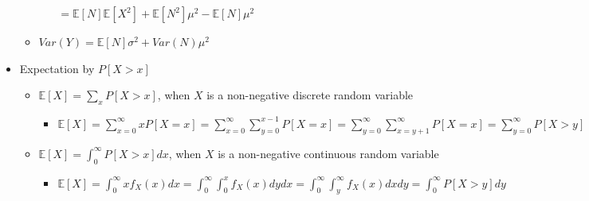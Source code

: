 \documentclass[a4paper]{article}
\begin{document}
\begin{itemize}
\begin{itemize}
\begin{itemize}
                        $= \mathbb{E}[N] \mathbb{E}[X^2] + \mathbb{E}[N^2] \mu^2 - \mathbb{E}[N] \mu^2$
                \end{itemize}
            \item $\mathit{Var}(Y) = \mathbb{E}[N]\sigma^2 + \mathit{Var}(N)\mu^2$
        \end{itemize}
    \item Expectation by $P[X>x]$
        \begin{itemize}
            \item $\mathbb{E}[X] = \sum_x P[X > x]$, when $X$ is a non-negative discrete random variable
                \begin{itemize}
                    \item $\mathbb{E}[X] = \sum_{x=0}^\infty x P[X = x] = \sum_{x=0}^\infty \sum_{y=0}^{x-1} P[X = x] = \sum_{y=0}^\infty \sum_{x=y + 1}^\infty P[X = x] = \sum_{y = 0}^\infty P[X > y]$
                \end{itemize}
            \item $\mathbb{E}[X] = \int_0^\infty P[X > x] dx$, when $X$ is a non-negative continuous random variable
                \begin{itemize}
                    \item $\mathbb{E}[X] = \int_0^\infty x f_X(x) dx = \int_0^\infty \int_0^x f_X(x) dy dx = \int_0^\infty \int_y^\infty f_X(x) dx dy = \int_0^\infty P[X > y] dy$
                \end{itemize}
        \end{itemize}
\end{itemize}
\end{document}
